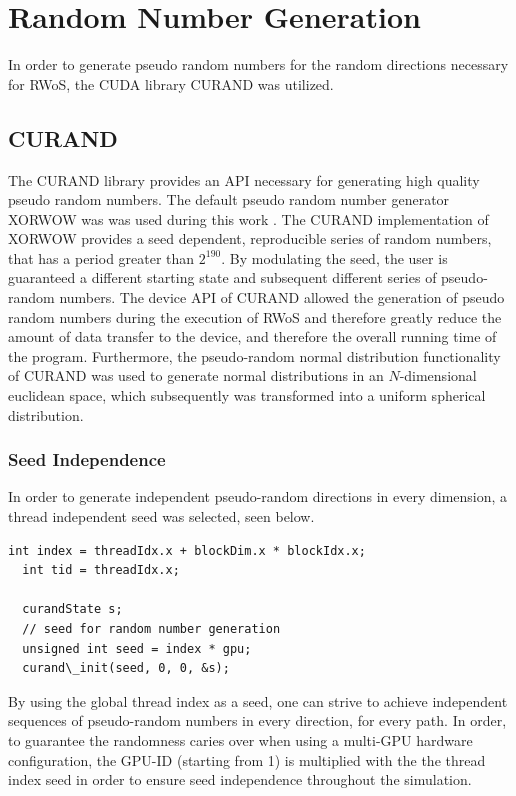 \section{Random Number Generation}
In order to generate pseudo random numbers for the random directions necessary
for \Gls{RWoS}, the \Gls{CUDA} library \Gls{CURAND} was utilized.
\subsection{CURAND}
The \Gls{CURAND} library provides an API necessary for generating high quality
pseudo random numbers.  The default pseudo random number generator XORWOW was
was used during this work \cite{xorwow}.  The CURAND implementation of XORWOW provides
a seed dependent, reproducible series of random numbers, that has
a period greater than $2^{190}$. By modulating the seed, the user is guaranteed a
different starting state and subsequent different series of pseudo-random numbers.
The device API of \Gls{CURAND} allowed
the generation of pseudo random numbers during the execution of \Gls{RWoS} and
therefore greatly reduce the amount of data transfer to the device, and therefore
the overall running time of the program.  Furthermore, the pseudo-random normal
distribution functionality of \Gls{CURAND} was used to generate normal distributions
in an $N$-dimensional euclidean space, which subsequently was transformed into a uniform spherical
distribution.
\subsubsection{Seed Independence}
In order to generate independent pseudo-random directions in every dimension,
a thread independent seed was selected, seen below.
\begin{lstlisting}[caption="Random Number Generation(source:src/wos\_native.cuh see: appendix \ref{appendix})",
  label=Random Number Generation]
  int index = threadIdx.x + blockDim.x * blockIdx.x;
  int tid = threadIdx.x;

  curandState s;
  // seed for random number generation
  unsigned int seed = index * gpu;
  curand\_init(seed, 0, 0, &s);
\end{lstlisting}
By using the global thread index as a seed, one can strive to achieve independent
sequences of pseudo-random numbers in every direction, for every path.  In order,
to guarantee the randomness caries over when using a multi-GPU hardware configuration,
the GPU-ID (starting from 1) is multiplied with the the thread index seed in order
to ensure seed independence throughout the simulation.

